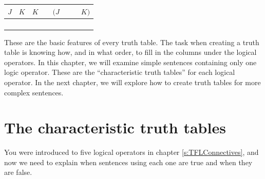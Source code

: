 \begin{center}
\begin{tabular}{d d | f e e e e e}
$J$&$K$&  	$K$&\eor&$(J$&\eand&\enot&$K)$\\
\hline
  &  & 	 & &  & & & \Tstrut\\
  &  & 	 & &  & & & \\
  &  & 	 & &  & & & \\
  &  &  & &  & & & 
\end{tabular}
\end{center}
\bigskip
\bigskip


These are the basic features of every truth table. The task when creating a truth table is knowing how, and in what order, to fill in the columns under the logical operators. In this chapter, we will examine simple sentences containing only one logic operator. These are the ``characteristic truth tables'' for each logical operator. In the next chapter, we will explore how to create truth tables for more complex sentences. 


\section{The characteristic truth tables}

You were introduced to five logical operators in chapter \ref{s:TFLConnectives}, and now we need to explain when sentences using each one are true and when they are false. 

